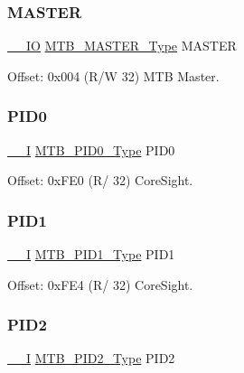 \subsubsection{\texorpdfstring{MASTER}{MASTER}}
{\footnotesize\ttfamily \mbox{\hyperlink{core__cm0plus_8h_aec43007d9998a0a0e01faede4133d6be}{\+\_\+\+\_\+\+IO}} \mbox{\hyperlink{union_m_t_b___m_a_s_t_e_r___type}{M\+T\+B\+\_\+\+M\+A\+S\+T\+E\+R\+\_\+\+Type}} M\+A\+S\+T\+ER}



Offset\+: 0x004 (R/W 32) M\+TB Master. 

\mbox{\label{struct_mtb_a56fe34aad0d3f7a207fd98df1165fdf5}} 
\subsubsection{\texorpdfstring{PID0}{PID0}}
{\footnotesize\ttfamily \mbox{\hyperlink{core__cm0plus_8h_af63697ed9952cc71e1225efe205f6cd3}{\+\_\+\+\_\+I}} \mbox{\hyperlink{union_m_t_b___p_i_d0___type}{M\+T\+B\+\_\+\+P\+I\+D0\+\_\+\+Type}} P\+I\+D0}



Offset\+: 0x\+F\+E0 (R/ 32) Core\+Sight. 

\mbox{\label{struct_mtb_aa511588ab355b6bb39feedd922958182}} 
\subsubsection{\texorpdfstring{PID1}{PID1}}
{\footnotesize\ttfamily \mbox{\hyperlink{core__cm0plus_8h_af63697ed9952cc71e1225efe205f6cd3}{\+\_\+\+\_\+I}} \mbox{\hyperlink{union_m_t_b___p_i_d1___type}{M\+T\+B\+\_\+\+P\+I\+D1\+\_\+\+Type}} P\+I\+D1}



Offset\+: 0x\+F\+E4 (R/ 32) Core\+Sight. 

\mbox{\label{struct_mtb_a5c13caf7ec911aa39e4a4f35dcf9ea03}} 
\subsubsection{\texorpdfstring{PID2}{PID2}}
{\footnotesize\ttfamily \mbox{\hyperlink{core__cm0plus_8h_af63697ed9952cc71e1225efe205f6cd3}{\+\_\+\+\_\+I}} \mbox{\hyperlink{union_m_t_b___p_i_d2___type}{M\+T\+B\+\_\+\+P\+I\+D2\+\_\+\+Type}} P\+I\+D2}




